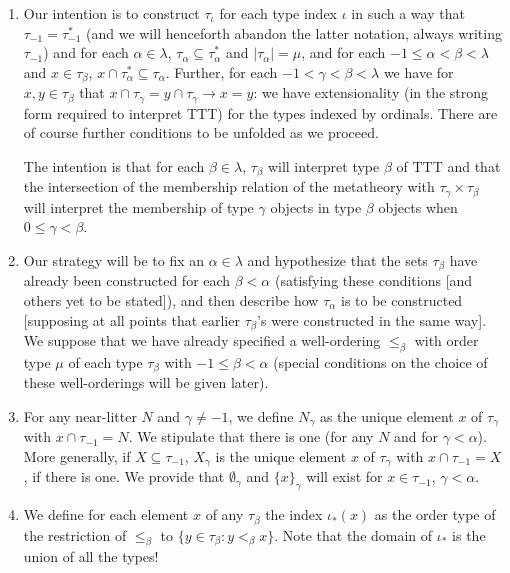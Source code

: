 \documentclass[12pt]{article}
\begin{document}
\begin{enumerate}
\item Our intention is to construct $\tau_\iota$ for each type index $\iota$ in such a way that $\tau_{-1} = \tau^*_{-1}$ (and we will henceforth abandon the latter notation, always writing $\tau_{-1}$)
and for each $\alpha \in \lambda$, $\tau_\alpha \subseteq \tau^*_\alpha$ and $|\tau_\alpha| = \mu$, and for each $-1 \leq \alpha < \beta <\lambda$ and $x \in \tau_\beta$,
$x \cap \tau^*_\alpha\subseteq \tau_\alpha$.   Further, for each $-1<\gamma<\beta<\lambda$ we
have for $x,y \in \tau_\beta$ that $x \cap \tau_\gamma = y \cap \tau_\gamma \rightarrow x=y$:  we have extensionality (in the strong form required to interpret TTT)  for the types indexed by ordinals.  There are of course further conditions to be unfolded as we proceed.

The intention is that for each $\beta \in \lambda$, $\tau_\beta$ will interpret type $\beta$ of TTT and that the intersection of the membership relation of the metatheory with $\tau_\gamma \times \tau_\beta$ will interpret the membership of type $\gamma$ objects in type $\beta$ objects when $0 \leq \gamma<\beta$.

\item Our strategy will be to fix an $\alpha\in \lambda$ and hypothesize that the sets $\tau_\beta$ have already been constructed for each $\beta<\alpha$ (satisfying these conditions [and others yet to be stated]), and then describe how $\tau_\alpha$ is to be constructed [supposing at all points that earlier $\tau_\beta$'s were constructed in the same way].   We suppose that we have already specified
a well-ordering $\leq_\beta$ with order type $\mu$ of each type $\tau_\beta$ with $-1\leq \beta <\alpha$ (special conditions on the choice of these well-orderings will be given later).   

\item For any near-litter $N$ and $\gamma\neq -1$, we define $N_\gamma$ as the unique element $x$  of $\tau_\gamma$ with $x \cap \tau_{-1} = N$.  We stipulate that there is one (for any $N$ and for $\gamma<\alpha$).  More generally, if
$X \subseteq \tau_{-1}$, $X_\gamma$ is the unique element $x$ of $\tau_\gamma$ with $x \cap \tau_{-1} = X$, if there is one.  We provide that $\emptyset_\gamma$ and $\{x\}_\gamma$ will exist
for $x \in \tau_{-1}$, $\gamma<\alpha$.

\item We define for each element $x$ of any $\tau_\beta$ the index $\iota_*(x)$
as the order type of the restriction of $\leq_\beta$ to $\{y \in \tau_\beta:y <_\beta x\}$.  Note that the domain of $\iota_*$ is the union of all the types!


\end{enumerate}
\end{document}
